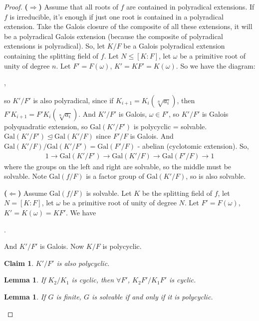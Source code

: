 \documentclass[9pt,reqno,twoside]{amsbook}
\theoremstyle{plain}
\newtheorem*{Claim}{Claim}
\numberwithin{section}{chapter}
\numberwithin{equation}{chapter}
\newtheorem{lem}[theorem]{Lemma}
\theoremstyle{definition}
\theoremstyle{remark}
\theoremstyle{plain}
\newcommand{\norm}{\trianglelefteq}
\newcommand{\bb}{\vspace{3mm}}
\newcommand{\bee}{\begin{equation}\begin{aligned}}
\newcommand{\eee}{\end{aligned}\end{equation}}
\newcommand{\gal}{\mathrm{Gal}}
\newcommand{\wer}{\sqrt}
\renewcommand{\leq}{\leqslant}
\begin{document}
\begin{proof}
\textbf{($\Rightarrow$)} Assume that all roots of $f$ are contained in polyradical extensions. If $f$ is irreducible, it's enough if just one root is contained in a polyradical extension. Take the Galois closure of the composite of all these extensions, it will be a polyradical Galois extension (because the composite of polyradical extensions is polyradical). So, let $K/F$ be a Galois polyradical extension containing the splitting field of $f$. Let $N \leq [K:F]$, let $\omega$ be a primitive root of unity of degree $n$. Let $F' = F(\omega)$, $K' = KF' = K(\omega)$. So we have the diagram:
\begin{center}
,
\end{center} 
so $K'/F'$ is also polyradical, since if $K_{i + 1} = K_{i}(\wer[n]{a_i})$, then $F'K_{i + 1} = F'K_i(\wer[n]{a_i})$. And $K'/F'$ is Galois, $\omega \in F'$, so $K'/F'$ is Galois polyquadratic extension, so $\gal(K'/F')$ is polycyclic = solvable. $\gal(K'/F') \norm \gal(K'/F)$ since $F'/F$ is Galois. And $\gal(K'/F)/\gal(K'/F') = \gal(F'/F)$ - abelian (cyclotomic extension). So, 
\bee
1 \to \gal(K'/F')\to \gal(K'/F)\to \gal(F'/F) \to 1
\eee
where the groups on the left and right are solvable, so the middle must be solvable. Note $\gal(f/F)$ is a factor group of $\gal(K'/F)$, so is also solvable. 
\bb

\textbf{($\Leftarrow$)} Assume $\gal(f/F)$ is solvable. Let $K$ be the splitting field of $f$, let $N = [K:F]$, let $\omega$ be a primitive root of unity of degree $N$. Let $F' = F(\omega)$, $K' = K(\omega) = KF'$. We have
\begin{center}
.
\end{center} 
And $K'/F'$ is Galois. 
Now $K/F$ is polycyclic. 

\begin{Claim}
$K'/F'$ is also polycyclic. 
\end{Claim} 
\begin{lem}
If $K_2/K_1$ is cyclic, then $\forall F'$, $K_2F'/K_1F'$ is cyclic. 
\end{lem}


\begin{lem}
If $G$ is finite, $G$ is solvable if and only if it is polycyclic. 
\end{lem}
\end{proof}
\end{document}
